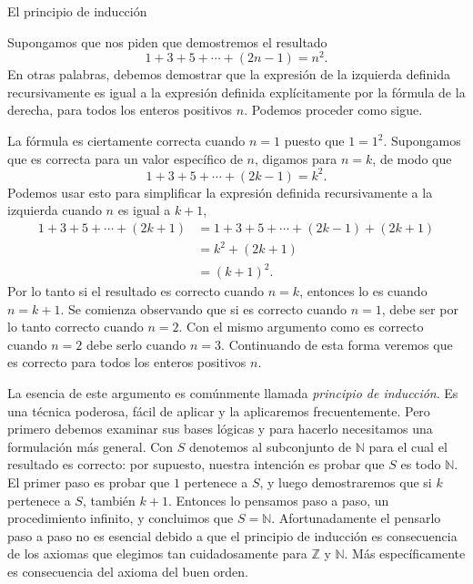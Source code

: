 \begin{section}{El principio de inducción}\label{1.4}

Supongamos que nos piden que demostremos el resultado
$$
1+3+5+\cdots+(2n-1) = n^2.
$$
En otras palabras, debemos demostrar que la expresión de la
izquierda definida recursivamente es igual a la expresión definida
explícitamente por la fórmula de la derecha, para todos los
enteros positivos $n$. Podemos proceder como sigue.

La fórmula es ciertamente correcta cuando $n=1$ puesto que
$1=1^2$.
 Supongamos que es correcta para un valor específico
de $n$, digamos para $n=k$, de modo que
$$
1+3+5+\cdots+(2k-1) = k^2.
$$
Podemos usar esto para simplificar la expresión definida
recursivamente a la izquierda cuando $n$ es igual a $k+1$,
$$
\begin{aligned}
1+3+5+\cdots+(2k+1) &= 1+3+5+\cdots+(2k-1) +(2k+1) \\
&=k^2 +(2k+1) \\
&=(k+1)^2.
\end{aligned}
$$
Por lo tanto si el resultado es correcto cuando $n=k$, entonces lo es cuando $n=k+1$. Se comienza observando que si es correcto cuando $n=1$, debe ser por lo tanto correcto cuando $n=2$. Con el mismo argumento como es correcto cuando $n=2$ debe serlo cuando $n=3$. Continuando de esta forma veremos que es correcto para todos los enteros positivos $n$.

La esencia de este argumento es comúnmente llamada {\it principio de inducción}. Es una técnica poderosa, fácil de aplicar y la aplicaremos frecuentemente. Pero primero debemos examinar sus bases lógicas y para hacerlo necesitamos una formulación más general. Con $S$ denotemos al subconjunto de $\mathbb N$ para el cual el resultado es correcto: por supuesto, nuestra intención es probar que $S$ es todo $\mathbb N$. El primer paso es probar que $1$ pertenece a $S$, y luego demostraremos que si $k$ pertenece a $S$, también $k+1$. Entonces lo pensamos paso a paso, un procedimiento infinito, y concluimos que $S=\mathbb N$. Afortunadamente el pensarlo paso a paso no es esencial debido a que el principio de inducción es consecuencia de los axiomas que elegimos tan cuidadosamente para $\mathbb Z$ y $\mathbb N$. Más específicamente es consecuencia del axioma del buen orden.


\end{section}
